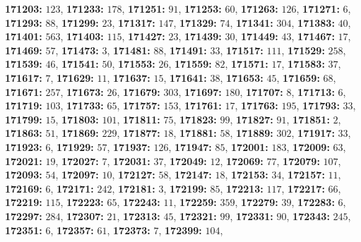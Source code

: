 \textsf{\bfseries 171203:} $123$, \textsf{\bfseries 171233:} $178$, \textsf{\bfseries 171251:} $91$, \textsf{\bfseries 171253:} $60$, \textsf{\bfseries 171263:} $126$, \textsf{\bfseries 171271:} $6$, \textsf{\bfseries 171293:} $88$, \textsf{\bfseries 171299:} $23$, \textsf{\bfseries 171317:} $147$, \textsf{\bfseries 171329:} $74$, \textsf{\bfseries 171341:} $304$, \textsf{\bfseries 171383:} $40$, \textsf{\bfseries 171401:} $563$, \textsf{\bfseries 171403:} $115$, \textsf{\bfseries 171427:} $23$, \textsf{\bfseries 171439:} $30$, \textsf{\bfseries 171449:} $43$, \textsf{\bfseries 171467:} $17$, \textsf{\bfseries 171469:} $57$, \textsf{\bfseries 171473:} $3$, \textsf{\bfseries 171481:} $88$, \textsf{\bfseries 171491:} $33$, \textsf{\bfseries 171517:} $111$, \textsf{\bfseries 171529:} $258$, \textsf{\bfseries 171539:} $46$, \textsf{\bfseries 171541:} $50$, \textsf{\bfseries 171553:} $26$, \textsf{\bfseries 171559:} $82$, \textsf{\bfseries 171571:} $17$, \textsf{\bfseries 171583:} $37$, \textsf{\bfseries 171617:} $7$, \textsf{\bfseries 171629:} $11$, \textsf{\bfseries 171637:} $15$, \textsf{\bfseries 171641:} $38$, \textsf{\bfseries 171653:} $45$, \textsf{\bfseries 171659:} $68$, \textsf{\bfseries 171671:} $257$, \textsf{\bfseries 171673:} $26$, \textsf{\bfseries 171679:} $303$, \textsf{\bfseries 171697:} $180$, \textsf{\bfseries 171707:} $8$, \textsf{\bfseries 171713:} $6$, \textsf{\bfseries 171719:} $103$, \textsf{\bfseries 171733:} $65$, \textsf{\bfseries 171757:} $153$, \textsf{\bfseries 171761:} $17$, \textsf{\bfseries 171763:} $195$, \textsf{\bfseries 171793:} $33$, \textsf{\bfseries 171799:} $15$, \textsf{\bfseries 171803:} $101$, \textsf{\bfseries 171811:} $75$, \textsf{\bfseries 171823:} $99$, \textsf{\bfseries 171827:} $91$, \textsf{\bfseries 171851:} $2$, \textsf{\bfseries 171863:} $51$, \textsf{\bfseries 171869:} $229$, \textsf{\bfseries 171877:} $18$, \textsf{\bfseries 171881:} $58$, \textsf{\bfseries 171889:} $302$, \textsf{\bfseries 171917:} $33$, \textsf{\bfseries 171923:} $6$, \textsf{\bfseries 171929:} $57$, \textsf{\bfseries 171937:} $126$, \textsf{\bfseries 171947:} $85$, \textsf{\bfseries 172001:} $183$, \textsf{\bfseries 172009:} $63$, \textsf{\bfseries 172021:} $19$, \textsf{\bfseries 172027:} $7$, \textsf{\bfseries 172031:} $37$, \textsf{\bfseries 172049:} $12$, \textsf{\bfseries 172069:} $77$, \textsf{\bfseries 172079:} $107$, \textsf{\bfseries 172093:} $54$, \textsf{\bfseries 172097:} $10$, \textsf{\bfseries 172127:} $58$, \textsf{\bfseries 172147:} $18$, \textsf{\bfseries 172153:} $34$, \textsf{\bfseries 172157:} $11$, \textsf{\bfseries 172169:} $6$, \textsf{\bfseries 172171:} $242$, \textsf{\bfseries 172181:} $3$, \textsf{\bfseries 172199:} $85$, \textsf{\bfseries 172213:} $117$, \textsf{\bfseries 172217:} $66$, \textsf{\bfseries 172219:} $115$, \textsf{\bfseries 172223:} $65$, \textsf{\bfseries 172243:} $11$, \textsf{\bfseries 172259:} $359$, \textsf{\bfseries 172279:} $39$, \textsf{\bfseries 172283:} $6$, \textsf{\bfseries 172297:} $284$, \textsf{\bfseries 172307:} $21$, \textsf{\bfseries 172313:} $45$, \textsf{\bfseries 172321:} $99$, \textsf{\bfseries 172331:} $90$, \textsf{\bfseries 172343:} $245$, \textsf{\bfseries 172351:} $6$, \textsf{\bfseries 172357:} $61$, \textsf{\bfseries 172373:} $7$, \textsf{\bfseries 172399:} $104$, 
